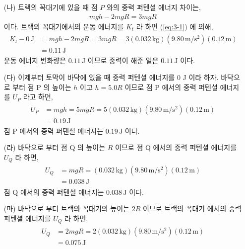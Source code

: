 \documentclass[floatfix,nofootinbib,superscriptaddress,fleqn]{revtex4-2}
\begin{document}
\begin{itemize}
  \item[(나)] 트랙의 꼭대기에 있을 때 점 $P$ 와의 중력 퍼텐셜 에너지 차이는,
  \begin{align}
    mgh - 2mgR = 3mgR
  \end{align}
  이다. 트랙의 꼭대기에서의 운동 에너지를 $K_t$ 라 하면 (\ref{eq:3-1}) 에 의해,
  \begin{align}
    \begin{split}
      K_t - 0\,\mathrm{J} &= mgh - 2mgR = 3mgR 
      =3(0.032\,\mathrm{kg})(9.80\,\mathrm{m/s^2})(0.12\,\mathrm{m})  \\
      &= 0.11\,\mathrm{J}
    \end{split}
  \end{align}
  운동 에너지 변화량은 $0.11\,\mathrm{J}$ 이므로 중력이 
  해준 일은 $0.11\,\mathrm{J}$ 이다.
  \item[(다)] 이제부터 토막이 바닥에 있을 때 중력 퍼텐셜 에너지를 0 J 이라 하자.
  바닥으로 부터 점 P 의 높이는 $h$ 이고 $h=5.0R$ 이므로
  점 P 에서의 중력 퍼텐셜 에너지를 $U_P$ 라고 하면,
  \begin{align}
    \begin{split}
      U_P &= mgh = 5mgR = 5(0.032\,\mathrm{kg})(9.80\,\mathrm{m/s^2})
      (0.12\,\mathrm{m})  \\
      &= 0.19\,\mathrm{J}
    \end{split}
  \end{align}
  점 P 에서의 중력 퍼텐셜 에너지는 $0.19\,\mathrm{J}$ 이다.
  \item[(라)] 바닥으로 부터 점 Q 의 높이는 $R$ 이므로 점 Q 에서의 중력 퍼텐셜 에너지를
  $U_Q$ 라 하면,
  \begin{align}
    \begin{split}
      U_Q &= mgR = (0.032\,\mathrm{kg})(9.80\,\mathrm{m/s^2})
      (0.12\,\mathrm{m})  \\
      &= 0.038\,\mathrm{J}
    \end{split}
  \end{align}
  점 Q 에서의 중력 퍼텐셜 에너지는 $0.038\,\mathrm{J}$ 이다.
  \item[(마)]
  바닥으로 부터 트랙의 꼭대기의 높이는 $2R$ 이므로 트랙의 꼭대기 
  에서의 중력 퍼텐셜 에너지를 $U_Q$ 라 하면,
  \begin{align}
    \begin{split}
      U_Q &= 2mgR = 2(0.032\,\mathrm{kg})(9.80\,\mathrm{m/s^2})
      (0.12\,\mathrm{m})  \\
      &=0.075\,\mathrm{J}
    \end{split}
  \end{align}

\end{itemize}
\end{document}
